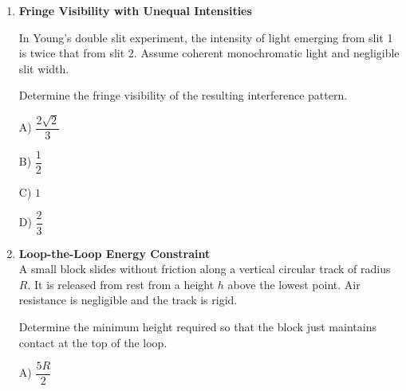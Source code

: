 \documentclass[12pt]{article}
\begin{document}
\begin{enumerate}
A linear damped harmonic oscillator has natural angular frequency $\omega_0$ and damping ratio $\zeta < 1$. The system is displaced and released from rest.

Determine the time interval between successive displacement maxima.

A) $\dfrac{2\pi}{\omega_0}$

B) $\dfrac{2\pi}{\omega_0\sqrt{1-\zeta^2}}$

C) $\dfrac{\pi}{\omega_0}$

D) $\dfrac{1}{\zeta\omega_0}$

\item \textbf{Fringe Visibility with Unequal Intensities}

In Young’s double slit experiment, the intensity of light emerging from slit 1 is twice that from slit 2. Assume coherent monochromatic light and negligible slit width.

Determine the fringe visibility of the resulting interference pattern.

A) $\dfrac{2\sqrt{2}}{3}$

B) $\dfrac{1}{2}$

C) $1$

D) $\dfrac{2}{3}$

\item \textbf{Loop-the-Loop Energy Constraint} \\ 


A small block slides without friction along a vertical circular track of radius $R$. It is released from rest from a height $h$ above the lowest point. Air resistance is negligible and the track is rigid.

Determine the minimum height required so that the block just maintains contact at the top of the loop.

\begin{center}
\end{center}

A) $\dfrac{5R}{2}$


\end{enumerate}
\end{document}
